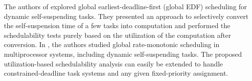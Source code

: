 The authors of \cite{dong-liu-RTSS2016} explored global earliest-deadline-first (global EDF) scheduling for dynamic self-suspending tasks. They presented an approach to selectively convert the self-suspension time of a few tasks into computation and performed the schedulability tests purely based on the utilization of the computation after conversion.
In \cite{ChenHLRTSS2015}, the authors studied global rate-monotonic scheduling in multiprocessor systems, including dynamic self-suspending tasks. The proposed utilization-based schedulability analysis  can easily be extended to handle constrained-deadline task systems and any given fixed-priority assignment.
  
  




  
